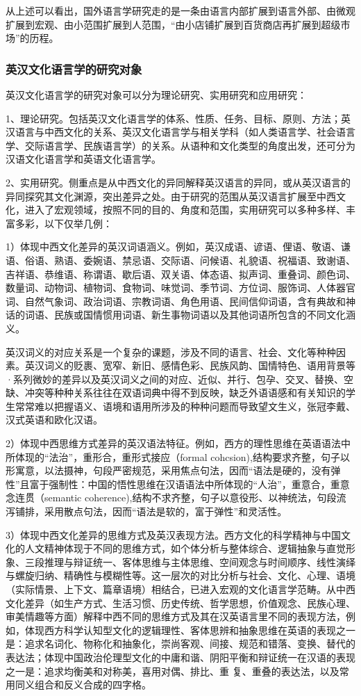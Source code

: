 从上述可以看出，国外语言学研究走的是一条由语言内部扩展到语言外部、由微观扩展到宏观、由小范围扩展到人范围，“由小店铺扩展到百货商店再扩展到超级市场”的历程。

\subsubsection{英汉文化语言学的研究对象}

英汉文化语言学的研究对象可以分为理论研究、实用研究和应用研究：

1、理论研究。包括英汉文化语言学的体系、性质、任务、目标、原则、方法；英汉语言与中西文化的关系、英汉文化语言学与相关学科（如人类语言学、社会语言学、交际语言学、民族语言学）的关系。从语种和文化类型的角度出发，还可分为汉语文化语言学和英语文化语言学。

2、实用研究。侧重点是从中西文化的异同解释英汉语言的异同，或从英汉语言的异同探究其文化渊源，突出差异之处。由于研究的范围从英汉语言扩展至中西文化，进入了宏观领域，按照不同的目的、角度和范围，实用研究可以多种多样、丰富多彩，以下仅举几例：

1）体现中西文化差异的英汉词语涵义。例如，英汉成语、谚语、俚语、敬语、谦语、俗语、熟语、委婉语、禁忌语、交际语、问候语、礼貌语、祝福语、致谢语、吉祥语、恭维语、称谓语、歇后语、双关语、体态语、拟声词、重叠词、颜色词、数量词、动物词、植物词、食物词、味觉词、季节词、方位词、服饰词、人体器官词、自然气象词、政治词语、宗教词语、角色用语、民间信仰词语，含有典故和神话的词语、民族或国情惯用词语、新生事物词语以及其他词语所包含的不同文化涵义。

英汉词义的对应关系是一个复杂的课题，涉及不同的语言、社会、文化等种种因素。英汉词义的贬裹、宽窄、新旧、感情色彩、民族风韵、国情特色、语用背景等·系列微妙的差异以及英汉词义之间的对应、近似、并行、包孕、交叉、替换、空缺、冲突等种种关系往往在双语词典中得不到反映，缺乏外语语感和有关知识的学生常常难以把握语义、语境和语用所涉及的种种问题而导致望文生义，张冠李戴、汉式英语和欧化汉语。

2）体现中西思维方式差异的英汉语法特征。例如，西方的理性思维在英语语法中所体现的“法治”，重形合，重形式接应（formal cohcsion),结构要求齐整，句子以形寓意，以法摄神，句段严密规范，采用焦点句法，因而“语法是硬的，没有弹性”且富于强制性：中国的悟性思维在汉语语法中所体现的“人治”，重意合，重意念连贯（semantic coherence),结构不求齐整，句子以意役形、以神统法，句段流泻铺排，采用散点句法，因而“语法是软的，富于弹性”和灵活性。

3）体现中西文化差异的思维方式及英汉表现方法。西方文化的科学精神与中国文化的人文精神体现于不同的思维方式，如个体分析与整体综合、逻辑抽象与直觉形象、三段推理与辩证统一、客体思维与主体思维、空间观念与时间顺序、线性演绎与螺旋归纳、精确性与模糊性等。这一层次的对比分析与社会、文化、心理、语境（实际情景、上下文、篇章语境）相结合，已进入宏观的文化语言学范畴。从中西文化差异（如生产方式、生活习惯、历史传统、哲学思想，价值观念、民族心理、审美情趣等方面）解释中西不同的思维方式及其在汉英语言里不同的表现方法，例如，体现西方科学认知型文化的逻辑理性、客体思辨和抽象思维在英语的表现之一是：追求名词化、物称化和抽象化，崇尚客观、间接、规范和错落、变换、替代的表达法；体现中国政治伦理型文化的中庸和谐、阴阳平衡和辩证统一在汉语的表现之一是：追求均衡美和对称美，喜用对偶、排比、重
复、重叠的表达法，以及常用同义组合和反义合成的四字格。

